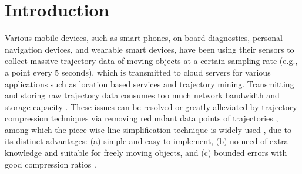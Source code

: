 \section{Introduction}
\label{sec-intro}

Various mobile devices, such as smart-phones, on-board diagnostics, personal navigation devices, and wearable smart devices, have been using their sensors to collect massive trajectory data of moving objects at a certain sampling rate (e.g., a point every $5$ seconds), which is transmitted to cloud servers for various applications such as location based services and trajectory mining.
%
Transmitting and storing raw trajectory data consumes too much network bandwidth and storage capacity \cite{Chen:Trajectory, Meratnia:Spatiotemporal, Liu:BQS, Muckell:Compression,Cao:Spatio, Popa:Spatio,Nibali:Trajic}. %
%
%
These issues can be resolved or greatly alleviated by trajectory compression techniques via removing redundant data points of trajectories \cite{Douglas:Peucker, Hershberger:Speeding, Meratnia:Spatiotemporal, Liu:BQS, Muckell:survey, Muckell:Compression, Chen:Trajectory, Cao:Spatio, Shi:Survey, Nibali:Trajic, Long:Direction, Popa:Spatio, Song:PRESS}, among which the piece-wise line {simplification} technique is widely used \cite{Douglas:Peucker, Meratnia:Spatiotemporal, Muckell:survey, Muckell:Compression, Chen:Trajectory, Cao:Spatio, Shi:Survey, Liu:BQS, Lin:Operb}, due to its distinct advantages: (a) simple and easy to implement, (b) no need of extra knowledge and suitable for freely  moving  objects, and (c) bounded errors with good compression ratios \cite{Popa:Spatio,Lin:Operb}.

